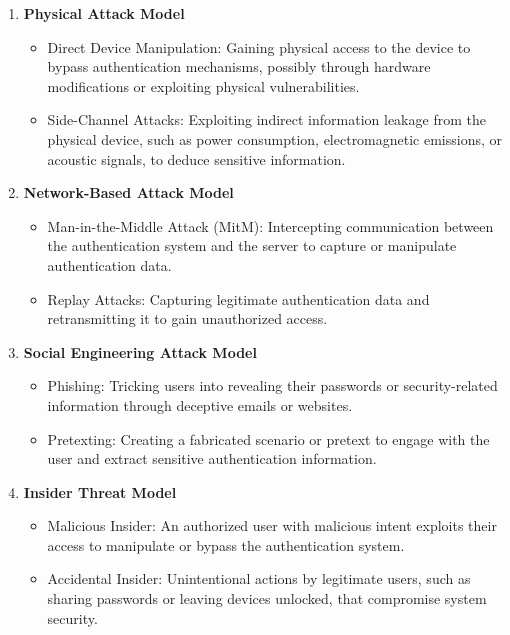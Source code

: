\documentclass{article}
\begin{document}
\begin{enumerate}[label=\arabic*.]
    \item \textbf{Physical Attack Model}
    \begin{itemize}
        \item Direct Device Manipulation: Gaining physical access to the device to bypass authentication mechanisms, possibly through hardware modifications or exploiting physical vulnerabilities.
        \item Side-Channel Attacks: Exploiting indirect information leakage from the physical device, such as power consumption, electromagnetic emissions, or acoustic signals, to deduce sensitive information.
    \end{itemize}
    
    \item \textbf{Network-Based Attack Model}
    \begin{itemize}
        \item Man-in-the-Middle Attack (MitM): Intercepting communication between the authentication system and the server to capture or manipulate authentication data.
        \item Replay Attacks: Capturing legitimate authentication data and retransmitting it to gain unauthorized access.
    \end{itemize}
    
    \item \textbf{Social Engineering Attack Model}
    \begin{itemize}
        \item Phishing: Tricking users into revealing their passwords or security-related information through deceptive emails or websites.
        \item Pretexting: Creating a fabricated scenario or pretext to engage with the user and extract sensitive authentication information.
    \end{itemize}
    
    \item \textbf{Insider Threat Model}
    \begin{itemize}
        \item Malicious Insider: An authorized user with malicious intent exploits their access to manipulate or bypass the authentication system.
        \item Accidental Insider: Unintentional actions by legitimate users, such as sharing passwords or leaving devices unlocked, that compromise system security.
    \end{itemize}
\end{enumerate}
\end{document}
